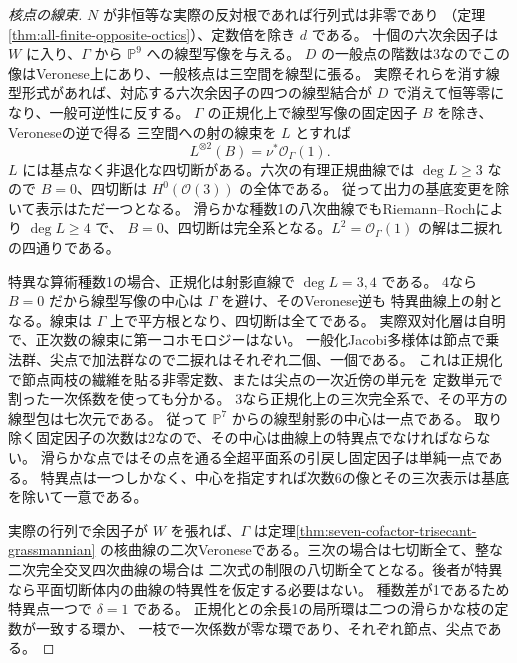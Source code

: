 \begin{proof}[核点の線束]
$N$ が非恒等な実際の反対根であれば行列式は非零であり
（定理\ref{thm:all-finite-opposite-octics}）、定数倍を除き $d$ である。
十個の六次余因子は $W$ に入り、$\Gamma$ から $\mathbb P^9$ への線型写像を与える。
$D$ の一般点の階数は3なのでこの像はVeronese上にあり、一般核点は三空間を線型に張る。
実際それらを消す線型形式があれば、対応する六次余因子の四つの線型結合が
$D$ で消えて恒等零になり、一般可逆性に反する。
$\Gamma$ の正規化上で線型写像の固定因子 $B$ を除き、Veroneseの逆で得る
三空間への射の線束を $L$ とすれば
\[
             L^{\otimes2}(B)=\nu^*\mathcal O_\Gamma(1).
\]
$L$ には基点なく非退化な四切断がある。六次の有理正規曲線では
$\deg L\ge3$ なので $B=0$、四切断は $H^0(\mathcal O(3))$ の全体である。
従って出力の基底変更を除いて表示はただ一つとなる。
滑らかな種数1の八次曲線でもRiemann--Rochにより $\deg L\ge4$ で、
$B=0$、四切断は完全系となる。$L^2=\mathcal O_\Gamma(1)$ の解は二捩れの四通りである。

特異な算術種数1の場合、正規化は射影直線で $\deg L=3,4$ である。
4なら $B=0$ だから線型写像の中心は $\Gamma$ を避け、そのVeronese逆も
特異曲線上の射となる。線束は $\Gamma$ 上で平方根となり、四切断は全てである。
実際双対化層は自明で、正次数の線束に第一コホモロジーはない。
一般化Jacobi多様体は節点で乗法群、尖点で加法群なので二捩れはそれぞれ二個、一個である。
これは正規化で節点両枝の繊維を貼る非零定数、または尖点の一次近傍の単元を
定数単元で割った一次係数を使っても分かる。
3なら正規化上の三次完全系で、その平方の線型包は七次元である。
従って $\mathbb P^7$ からの線型射影の中心は一点である。
取り除く固定因子の次数は2なので、その中心は曲線上の特異点でなければならない。
滑らかな点ではその点を通る全超平面系の引戻し固定因子は単純一点である。
特異点は一つしかなく、中心を指定すれば次数6の像とその三次表示は基底を除いて一意である。

実際の行列で余因子が $W$ を張れば、$\Gamma$ は定理\ref{thm:seven-cofactor-trisecant-grassmannian}
の核曲線の二次Veroneseである。三次の場合は七切断全て、整な二次完全交叉四次曲線の場合は
二次式の制限の八切断全てとなる。後者が特異なら平面切断体内の曲線の特異性を仮定する必要はない。
種数差が1であるため特異点一つで $\delta=1$ である。
正規化との余長1の局所環は二つの滑らかな枝の定数が一致する環か、
一枝で一次係数が零な環であり、それぞれ節点、尖点である。
\end{proof}

